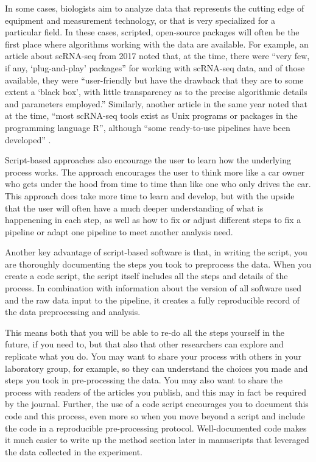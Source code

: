 \documentclass[]{tufte-book}
\begin{document}
In some cases, biologists aim to analyze data that represents the cutting edge
of equipment and measurement technology, or that is very specialized for a
particular field. In these cases, scripted, open-source packages will often be
the first place where algorithms working with the data are available. For
example, an article about scRNA-seq from 2017 noted that, at the time, there
were ``very few, if any, `plug-and-play' packages'' for working with scRNA-seq
data, and of those available, they were ``user-friendly but have the drawback
that they are to some extent a `black box', with little transparency as to the
precise algorithmic details and parameters employed.'' \citep{haque2017practical}
Similarly, another article in the same year noted that at the time, ``most
scRNA-seq tools exist as Unix programs or packages in the programming language
R'', although ``some ready-to-use pipelines have been developed''
\citep{perkel2017single}.

Script-based approaches also encourage the user to learn how the underlying process
works. The approach encourages the user to think more like a car owner who gets
under the hood from time to time than like one who only drives the car. This
approach does take more time to learn and develop, but with the upside that the
user will often have a much deeper understanding of what is happenening in each
step, as well as how to fix or adjust different steps to fix a pipeline or
adapt one pipeline to meet another analysis need.

Another key advantage of script-based software is that, in writing the
script, you are thoroughly documenting the steps you took to preprocess the
data. When you create a code script, the script itself includes all
the steps and details of the process. In combination with information about the
version of all software used and the raw data input to the pipeline, it creates
a fully reproducible record of the data preprocessing and analysis.

This means both that you will be able to re-do all the steps
yourself in the future, if you need to, but that also that other researchers can
explore and replicate what you do. You may want to share your process with
others in your laboratory group, for example, so they can understand the choices
you made and steps you took in pre-processing the data. You may also want to
share the process with readers of the articles you publish, and this may in fact
be required by the journal. Further, the use of a code script encourages you to
document this code and this process, even more so when you move beyond a script
and include the code in a reproducible pre-processing protocol. Well-documented
code makes it much easier to write up the method section later in manuscripts
that leveraged the data collected in the experiment.
\end{document}
